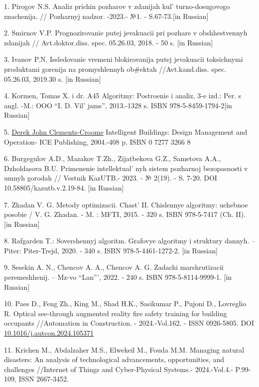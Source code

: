 \begin{references}
1. Pirogov N.S. Analiz prichin pozharov v zdanijah
kul' turno-dosugovogo znachenija. // Pozharnyj nadzor.
-2023.- №1. - S.67-73.{[}in Russian{]}

2. Smirnov V.P. Prognozirovanie putej jevakuacii pri pozhare v
obshhestvennyh zdanijah // Avt.doktor.diss. spec. 05.26.03, 2018. - 50
s. {[}in Russian{]}

3. Ivanov P.N. Issledovanie vremeni blokirovanija putej jevakuacii
toksichnymi produktami gorenija na promyshlennyh ob\#ektah
//Avt.kand.diss. spec. 05.26.03, 2019.30 s. {[}in Russian{]}

4. Kormen, Tomas X. i dr. A45 Algoritmy: Postroenie i analiz, 3-e izd.:
Per. s angl. -M.: OOO ``I. D. Vil' jams'', 2013.-1328 s.
ISBN 978-5-8459-1794-2{[}in Russian{]}

5. \href{https://www.researchgate.net/profile/Derek-Clements-Croome}{Derek
John Clements-Croome} Intelligent Buildings: Design Management and
Operation- ICE Publishing, 2004.-408 p. ISBN 0 7277 3266 8

6. Burgegulov A.D., Mazakov T.Zh., Zijatbekova G.Z., Sametova A.A.,
Dzholdasova B.U. Primenenie intellektual' nyh sistem
pozharnoj bezopasnosti v umnyh gorodah // Vestnik KazUTB.- 2023. - №
2(19). - S. 7-20. DOI 10.58805/kazutb.v.2.19-84. {[}in Russian{]}

7. Zhadan V. G. Metody optimizacii. Chast'{} II.
Chislennye algoritmy: uchebnoe posobie / V. G. Zhadan. - M. : MFTI,
2015. - 320 s. ISBN 978-5-7417 (Ch. II). {[}in Russian{]}

8. Rafgarden T.: Sovershennyj algoritm. Grafovye algoritmy i struktury
dannyh. -- Piter: Piter-Trejd, 2020. - 340 s. ISBN 978-5-4461-1272-2.
{[}in Russian{]}

9. Sesekin A. N., Chencov A. A., Chencov A. G. Zadachi marshrutizacii
peremeshhenij. -- Mz-vo ``Lan''', 2022. - 240 s. ISBN
978-5-8114-9999-1. {[}in Russian{]}

10. Paes D., Feng Zh., King M., Shad H.K., Sasikumar P., Pujoni D.,
Lovreglio R. Optical see-through augmented reality fire safety training
for building occupants //Automation in Construction. - 2024.-Vol.162. -
ISSN 0926-5805. DOI
\href{https://doi.org/10.1016/j.autcon.2024.105371}{10.1016/j.autcon.2024.105371}

11. Krichen M., Abdalzaher M.S., Elwekeil M., Fouda M.M. Managing
natural disasters: An analysis of technological advancements,
opportunities, and challenges //Internet of Things and Cyber-Physical
Systems.- 2024.-Vol.4.- P.99-109, ISSN 2667-3452.


\end{references}

